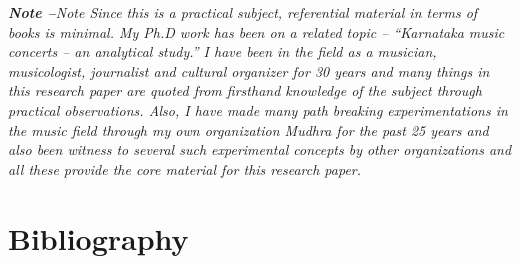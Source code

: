 \textit{\textbf{Note –}Note Since this is a practical subject, referential material in terms of books is minimal. My Ph.D work has been on a related topic – “Karnataka music concerts – an analytical study.” I have been in the field as a musician, musicologist, journalist and cultural organizer for 30 years and many things in this research paper are quoted from firsthand knowledge of the subject through practical observations. Also, I have made many path breaking experimentations in the music field through my own organization Mudhra for the past 25 years and also been witness to several such experimental concepts by other organizations and all these provide the core material for this research paper.}


\section*{Bibliography}

